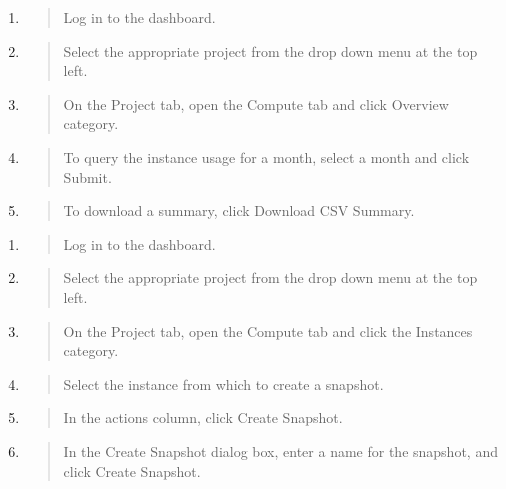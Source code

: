 \begin{enumerate}
\def\labelenumi{\arabic{enumi}.}
\item
  \begin{quote}
  Log in to the dashboard.
  \end{quote}
\item
  \begin{quote}
  Select the appropriate project from the drop down menu at the top
  left.
  \end{quote}
\item
  \begin{quote}
  On the Project tab, open the Compute tab and click Overview category.
  \end{quote}
\item
  \begin{quote}
  To query the instance usage for a month, select a month and click
  Submit.
  \end{quote}
\item
  \begin{quote}
  To download a summary, click Download CSV Summary.
  \end{quote}
\end{enumerate}

\label{create-an-instance-snapshot}

\begin{enumerate}
\def\labelenumi{\arabic{enumi}.}
\item
  \begin{quote}
  Log in to the dashboard.
  \end{quote}
\item
  \begin{quote}
  Select the appropriate project from the drop down menu at the top
  left.
  \end{quote}
\item
  \begin{quote}
  On the Project tab, open the Compute tab and click the Instances
  category.
  \end{quote}
\item
  \begin{quote}
  Select the instance from which to create a snapshot.
  \end{quote}
\item
  \begin{quote}
  In the actions column, click Create Snapshot.
  \end{quote}
\item
  \begin{quote}
  In the Create Snapshot dialog box, enter a name for the snapshot, and
  click Create Snapshot.
  \end{quote}
\end{enumerate}

